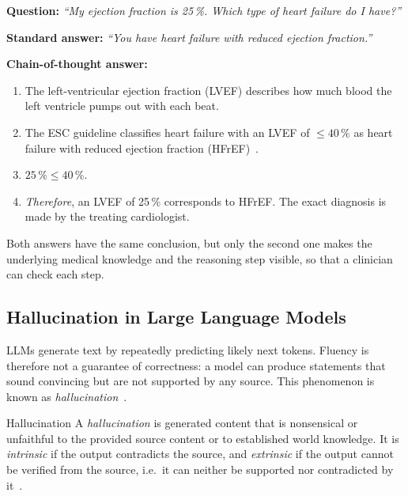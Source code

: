 \begin{bgexample}
\textbf{Question:} \emph{``My ejection fraction is 25\,\%. Which type of
heart failure do I have?''}\par\smallskip
\textbf{Standard answer:} \emph{``You have heart failure with reduced ejection
fraction.''}\par\smallskip
\textbf{Chain-of-thought answer:}
\begin{enumerate}
  \item The left-ventricular ejection fraction (LVEF) describes how much blood
        the left ventricle pumps out with each beat.
  \item The ESC guideline classifies heart failure with an LVEF of
        $\leq 40\,\%$ as heart failure with reduced ejection fraction
        (HFrEF)~\cite{mcdonagh2021esc}.
  \item $25\,\% \leq 40\,\%$.
  \item \emph{Therefore}, an LVEF of 25\,\% corresponds to HFrEF. The exact
        diagnosis is made by the treating cardiologist.
\end{enumerate}
Both answers have the same conclusion, but only the second one makes the
underlying medical knowledge and the reasoning step visible, so that a
clinician can check each step.
\end{bgexample}

\subsection{Hallucination in Large Language Models}
\label{sec:bg-hallucination}

LLMs generate text by repeatedly predicting likely next tokens. Fluency is
therefore not a guarantee of correctness: a model can produce statements that
sound convincing but are not supported by any source. This phenomenon is
known as \emph{hallucination}~\cite{ji2023survey}.

\begin{bgdefinition}{Hallucination}
A \emph{hallucination} is generated content that is nonsensical or unfaithful
to the provided source content or to established world knowledge. It is
\emph{intrinsic} if the output contradicts the source, and \emph{extrinsic}
if the output cannot be verified from the source, i.e.\ it can neither be
supported nor contradicted by it~\cite{ji2023survey}.
\end{bgdefinition}

